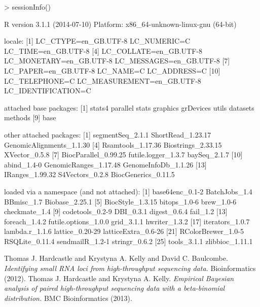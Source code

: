 \documentclass[a4paper]{article}
\begin{document}
\begin{Schunk}
\begin{Sinput}
> sessionInfo()
\end{Sinput}
\begin{Soutput}
R version 3.1.1 (2014-07-10)
Platform: x86_64-unknown-linux-gnu (64-bit)

locale:
 [1] LC_CTYPE=en_GB.UTF-8       LC_NUMERIC=C               LC_TIME=en_GB.UTF-8       
 [4] LC_COLLATE=en_GB.UTF-8     LC_MONETARY=en_GB.UTF-8    LC_MESSAGES=en_GB.UTF-8   
 [7] LC_PAPER=en_GB.UTF-8       LC_NAME=C                  LC_ADDRESS=C              
[10] LC_TELEPHONE=C             LC_MEASUREMENT=en_GB.UTF-8 LC_IDENTIFICATION=C       

attached base packages:
[1] stats4    parallel  stats     graphics  grDevices utils     datasets  methods  
[9] base     

other attached packages:
 [1] segmentSeq_2.1.1         ShortRead_1.23.17        GenomicAlignments_1.1.30
 [4] Rsamtools_1.17.36        Biostrings_2.33.15       XVector_0.5.8           
 [7] BiocParallel_0.99.25     futile.logger_1.3.7      baySeq_2.1.7            
[10] abind_1.4-0              GenomicRanges_1.17.48    GenomeInfoDb_1.1.26     
[13] IRanges_1.99.32          S4Vectors_0.2.8          BiocGenerics_0.11.5     

loaded via a namespace (and not attached):
 [1] base64enc_0.1-2      BatchJobs_1.4        BBmisc_1.7           Biobase_2.25.1      
 [5] BiocStyle_1.3.15     bitops_1.0-6         brew_1.0-6           checkmate_1.4       
 [9] codetools_0.2-9      DBI_0.3.1            digest_0.6.4         fail_1.2            
[13] foreach_1.4.2        futile.options_1.0.0 grid_3.1.1           hwriter_1.3.2       
[17] iterators_1.0.7      lambda.r_1.1.6       lattice_0.20-29      latticeExtra_0.6-26 
[21] RColorBrewer_1.0-5   RSQLite_0.11.4       sendmailR_1.2-1      stringr_0.6.2       
[25] tools_3.1.1          zlibbioc_1.11.1     
\end{Soutput}
\end{Schunk}


\begin{thebibliography}{99}
 Thomas J. Hardcastle and Krystyna A. Kelly and David C. Baulcombe. \textsl{Identifying small RNA loci from high-throughput sequencing data.} Bioinformatics (2012).
 Thomas J. Hardcastle and Krystyna A. Kelly. \textsl{Empirical Bayesian analysis of paired high-throughput sequencing data with a beta-binomial distribution.} BMC Bioinformatics (2013).

\end{thebibliography}
\end{document}
